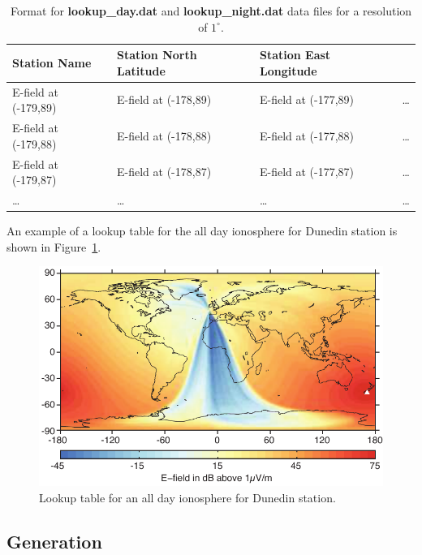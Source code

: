 \begin{table}[h!]
\begin{center}
\begin{tabular}{|p{1.5in}|p{1.75in}|p{1.75in}|p{1in}|}
\hline
\rule{0pt}{3ex}
Station Name	&Station North Latitude	&	Station East Longitude & \\ 
\hline
\rule{0pt}{3ex}
E-field at (-179,89)	& E-field at (-178,89) &	E-field at (-177,89) & \dots \\ 
\hline
\rule{0pt}{3ex}
E-field at (-179,88)	& E-field at (-178,88) &	E-field at (-177,88) & \dots \\ 
\hline
\rule{0pt}{3ex}
E-field at (-179,87)	& E-field at (-178,87) &	E-field at (-177,87) & \dots \\ 
\hline
\rule{0pt}{3ex}
\dots	& \dots &	\dots & \dots \\ 
\hline
\end{tabular}
\end{center}
\caption{Format for \textbf{lookup\_day.dat} and \textbf{lookup\_night.dat} data files for a resolution of $1^\circ$.}
\label{bootstrap:table:lookup}
\end{table}

An example of a lookup table for the all day ionosphere for Dunedin station is shown in Figure~\ref{bootstrap:fig:lookup}.

\begin{figure}[ht!]
   \centering
   \includegraphics[scale=1]{Introduction/Figures/lwpc_lookup.pdf} 
   \caption{Lookup table for an all day ionosphere for Dunedin station.}
   \label{bootstrap:fig:lookup}
\end{figure}

\subsection{Generation}

